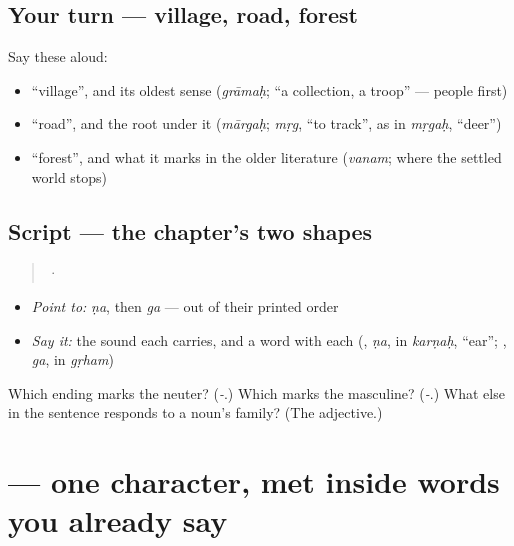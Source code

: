 \subsection*{Your turn — village, road, forest}
Say these aloud:

\begin{itemize}
\raggedright
  \item \textquotedblleft{}village\textquotedblright{}, and its oldest sense (\emph{grāmaḥ}; \textquotedblleft{}a collection, a troop\textquotedblright{} — people first)
  \item \textquotedblleft{}road\textquotedblright{}, and the root under it (\emph{mārgaḥ}; \emph{mṛg}, \textquotedblleft{}to track\textquotedblright{}, as in \emph{mṛgaḥ}, \textquotedblleft{}deer\textquotedblright{})
  \item \textquotedblleft{}forest\textquotedblright{}, and what it marks in the older literature (\emph{vanam}; where the settled world stops)
\end{itemize}

\subsection*{Script — the chapter's two shapes}
\begin{quote}
 · 
\end{quote}

\begin{itemize}
\raggedright
  \item \emph{Point to:} \emph{ṇa}, then \emph{ga} — out of their printed order
  \item \emph{Say it:} the sound each carries, and a word with each (\textbf{}, \emph{ṇa}, in \emph{karṇaḥ}, \textquotedblleft{}ear\textquotedblright{}; \textbf{}, \emph{ga}, in \emph{gṛham})
\end{itemize}

\begin{tcolorbox}[breakable,colback=teal!4,colframe=teal!35!black,title={Before you move on}]
Which ending marks the neuter? (\emph{-}.) Which marks the masculine? (\emph{-}.) What else in the sentence responds to a noun's family? (The adjective.)
\end{tcolorbox}
\section[\texorpdfstring{\sk{ज} (ja)}{ज (ja)}]{ — one character, met inside words you already say}


